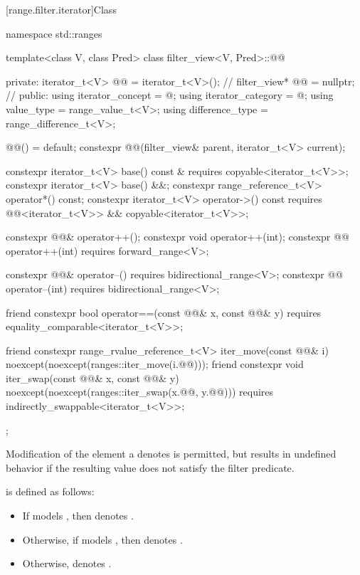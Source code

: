 [range.filter.iterator]{Class }

%
\begin{codeblock}
namespace std::ranges {
  template<class V, class Pred>
  class filter_view<V, Pred>::@@ {
  private:
    iterator_t<V> @@ = iterator_t<V>();   // \expos
    filter_view* @@ = nullptr;             // \expos
  public:
    using iterator_concept  = @\seebelow@;
    using iterator_category = @\seebelow@;
    using value_type        = range_value_t<V>;
    using difference_type   = range_difference_t<V>;

    @@() = default;
    constexpr @@(filter_view& parent, iterator_t<V> current);

    constexpr iterator_t<V> base() const &
      requires copyable<iterator_t<V>>;
    constexpr iterator_t<V> base() &&;
    constexpr range_reference_t<V> operator*() const;
    constexpr iterator_t<V> operator->() const
      requires @@<iterator_t<V>> && copyable<iterator_t<V>>;

    constexpr @@& operator++();
    constexpr void operator++(int);
    constexpr @@ operator++(int) requires forward_range<V>;

    constexpr @@& operator--() requires bidirectional_range<V>;
    constexpr @@ operator--(int) requires bidirectional_range<V>;

    friend constexpr bool operator==(const @@& x, const @@& y)
      requires equality_comparable<iterator_t<V>>;

    friend constexpr range_rvalue_reference_t<V> iter_move(const @@& i)
      noexcept(noexcept(ranges::iter_move(i.@@)));
    friend constexpr void iter_swap(const @@& x, const @@& y)
      noexcept(noexcept(ranges::iter_swap(x.@@, y.@@)))
      requires indirectly_swappable<iterator_t<V>>;
  };
}
\end{codeblock}

\pnum
Modification of the element a  denotes is
permitted, but results in undefined behavior if the resulting value does not
satisfy the filter predicate.

\pnum
{} is defined as follows:
\begin{itemize}
\item If  models , then
 denotes .

\item Otherwise, if  models , then
 denotes .

\item Otherwise,  denotes .
\end{itemize}

